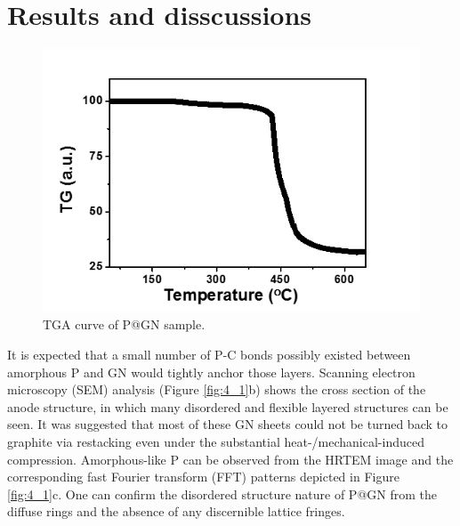 \section{Results and disscussions}


\begin{figure}  
\includegraphics[width=\textwidth]{figures/figure4_s4}
\caption[TGA curve of P@GN]
{TGA curve of P@GN sample.
\label{fig:4_s4}}
\end{figure}

It is expected that a small number of P-C bonds possibly existed between amorphous P and GN would tightly anchor those layers. Scanning electron microscopy (SEM) analysis (Figure \ref{fig:4_1}b) shows the cross section of the anode structure, in which many disordered and flexible layered structures can be seen. It was suggested that most of these GN sheets could not be turned back to graphite via restacking even under the substantial heat-/mechanical-induced compression.\cite{Huang2015b} Amorphous-like P can be observed from the HRTEM image and the corresponding fast Fourier transform (FFT) patterns depicted in Figure \ref{fig:4_1}c. One can confirm the disordered structure nature of P@GN from the diffuse rings and the absence of any discernible lattice fringes. 

